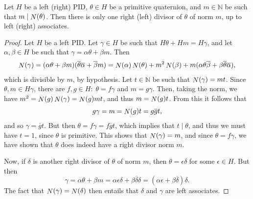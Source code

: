 \documentclass[10pt,a4paper]{amsart}
\newcommand\NN{\mathbb{N}}
\newcommand\N{\mathop{\rm N}\nolimits}
\begin{document}
\begin{theorem}\label{divisor}
  Let $H$ be a left (right) PID, $\theta \in H$ be a primitive
  quaternion, and $m \in \NN$ be such that $ m \mid \N(\theta)$. Then
  there is only one right (left) divisor of $\theta$ of norm $m$, up
  to left (right) associates.
\end{theorem}

\begin{proof}
  Let $H$ be a left PID.  Let $\gamma \in H$ be such that
  $H \theta + H m = H \gamma$, and let $\alpha, \beta \in H$ be such
  that $\gamma = \alpha \theta + \beta m$. Then
  \[\N(\gamma) = (\alpha \theta + \beta m ) (\overline{\theta}
    \overline{\alpha} + \overline{\beta}m) = \N(\alpha) \N(\theta) +
    m^2 \N(\beta) + m (\alpha \theta \overline{\beta} + \beta
    \overline{\theta} \overline{\alpha}),\] which is divisible by $m$,
  by hypothesis. Let $t \in \NN$ be such that $\N(\gamma)=mt$. Since
  $\theta, m \in H\gamma$, there are
  $f,g \in H \colon \; \theta = f \gamma$ and $m = g \gamma$. Then,
  taking the norm, we have $m^2 = \N(g) \N(\gamma) = \N(g) mt$, and
  thus $m = \N(g)t$. From this it follows that
  \[g \gamma = m = \N(g) t = g\overline{g}t,\] and so
  $\gamma = \overline{g}t$. But then
  $\theta = f \gamma = f \overline{g}t$, which implies that
  $t \mid \theta$, and thus we must have $t = 1$, since $\theta$ is
  primitive. This shows that $\N(\gamma) = m$, and since
  $\theta = f \gamma$, we have shown that $\theta$ does indeed have a
  right divisor norm $m$.
	
  Now, if $\delta$ is another right divisor of $\theta$ of norm $m$,
  then $\theta = \epsilon \delta$ for some $\epsilon \in H$.  But then
  \[\gamma = \alpha \theta + \beta m = \alpha \epsilon \delta + \beta
    \overline{\delta} \delta = (\alpha \epsilon + \beta
    \overline{\delta}) \delta.\] The fact that
  $\N(\gamma) = \N(\delta)$ then entails that $\delta$ and $\gamma$
  are left associates.
\end{proof}
\end{document}
